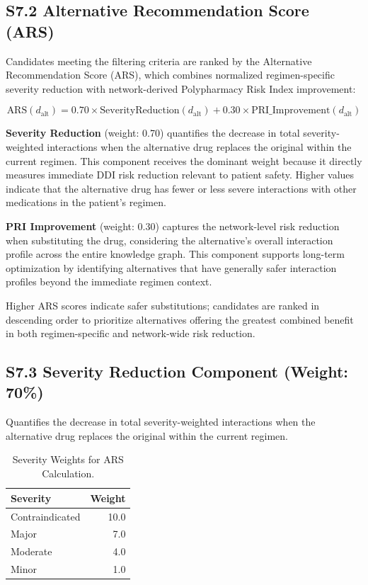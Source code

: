 \documentclass[12pt,a4paper]{article}
\begin{document}
\subsection{S7.2 Alternative Recommendation Score (ARS)}

Candidates meeting the filtering criteria are ranked by the Alternative Recommendation Score (ARS), which combines normalized regimen-specific severity reduction with network-derived Polypharmacy Risk Index improvement:

\[
\text{ARS}(d_{\text{alt}}) = 0.70 \times \text{SeverityReduction}(d_{\text{alt}}) + 0.30 \times \text{PRI\_Improvement}(d_{\text{alt}})
\]

\textbf{Severity Reduction} (weight: 0.70) quantifies the decrease in total severity-weighted interactions when the alternative drug replaces the original within the current regimen. This component receives the dominant weight because it directly measures immediate DDI risk reduction relevant to patient safety. Higher values indicate that the alternative drug has fewer or less severe interactions with other medications in the patient's regimen.

\textbf{PRI Improvement} (weight: 0.30) captures the network-level risk reduction when substituting the drug, considering the alternative's overall interaction profile across the entire knowledge graph. This component supports long-term optimization by identifying alternatives that have generally safer interaction profiles beyond the immediate regimen context.

Higher ARS scores indicate safer substitutions; candidates are ranked in descending order to prioritize alternatives offering the greatest combined benefit in both regimen-specific and network-wide risk reduction.

\subsection{S7.3 Severity Reduction Component (Weight: 70\%)}

Quantifies the decrease in total severity-weighted interactions when the alternative drug replaces the original within the current regimen.

\begin{table}[H]
\centering
\caption{Severity Weights for ARS Calculation.}
\label{tab:severity_weights_ars}
\begin{tabular}{@{}lr@{}}
\toprule
\textbf{Severity} & \textbf{Weight} \\
\midrule
Contraindicated & 10.0 \\
Major & 7.0 \\
Moderate & 4.0 \\
Minor & 1.0 \\
\bottomrule
\end{tabular}
\end{table}
\end{document}
